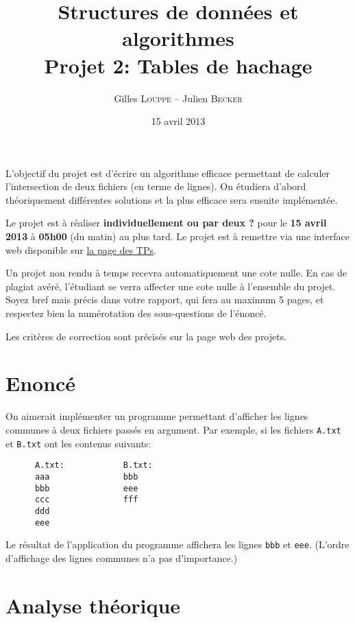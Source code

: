 \documentclass[a4paper,10pt]{article}
\title{
    \textbf{Structures de données et algorithmes}\\
    Projet 2: Tables de hachage
}
\author{Gilles \textsc{Louppe} -- Julien \textsc{Becker}}
\date{15 avril 2013}
\begin{document}
\maketitle

L'objectif du projet est d'écrire un algorithme efficace permettant de
calculer l'intersection de deux fichiers (en terme de lignes). On
étudiera d'abord théoriquement différentes solutions et la plus
efficace sera ensuite implémentée.

Le projet est à réaliser {\bf individuellement ou par deux ?} pour le {\bf 15 avril 2013} à
{\bf 05h00} (du matin) au plus tard. Le projet est à remettre via une interface
web disponible sur \href{http://www.montefiore.ulg.ac.be/~glouppe/2012-2013/students.info0902.php}{la page des TPs}.

Un projet non rendu à temps recevra automatiquement une cote nulle. En
cas de plagiat avéré, l'étudiant se verra affecter une cote nulle à
l'ensemble du projet. Soyez bref mais précis dans votre rapport, qui
fera au maximum 5 pages, et respectez bien la numérotation des
sous-questions de l'énoncé.

Les critères de correction sont précisés sur la page web des projets.

\section{Enoncé}

On aimerait implémenter un programme permettant d'afficher les lignes
communes à deux fichiers passés en argument. Par exemple, si les
fichiers \texttt{A.txt} et \texttt{B.txt} ont les contenus suivants:

\begin{verbatim}
      A.txt:            B.txt:
      aaa               bbb
      bbb               eee
      ccc               fff
      ddd
      eee
\end{verbatim}

Le résultat de l'application du programme affichera les lignes
\texttt{bbb} et \texttt{eee}. (L'ordre d'affichage des lignes communes n'a pas
d'importance.)

\section{Analyse théorique}
\end{document}
